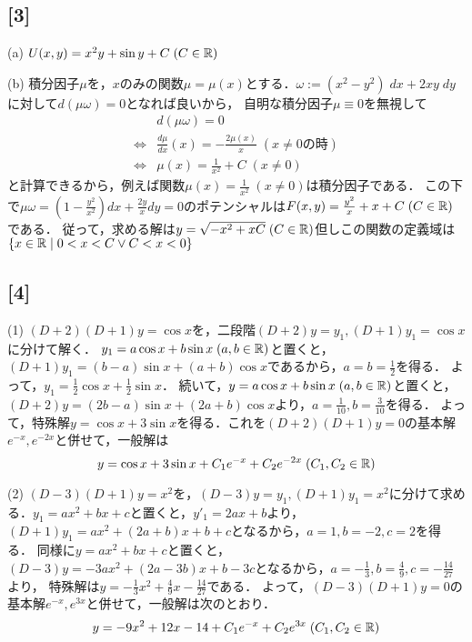 \documentclass[uplatex,dvipdfmx]{jsarticle}
\begin{document}
\subsection*{[3]}
(a) $U(x,y)=x^2y+\sin y+C\;(C\in\mathbb{R})$

(b) 積分因子$\mu$を，$x$のみの関数$\mu=\mu(x)$とする．$\omega:=(x^2-y^2)\;dx+2xy\;dy$に対して$d(\mu\omega)=0$となれば良いから，
自明な積分因子$\mu\equiv 0$を無視して
\begin{align*}
    &d(\mu\omega)=0\\
    \Leftrightarrow& \frac{d\mu}{dx}(x)=-\frac{2\mu(x)}{x}\;(x\ne 0の時)\\
    \Leftrightarrow& \mu(x)=\frac{1}{x^2}+C\;(x\ne 0)
\end{align*}
と計算できるから，例えば関数$\mu(x)=\frac{1}{x^2}\;(x\ne 0)$は積分因子である．
この下で$\mu\omega=\left(1-\frac{y^2}{x^2}\right)dx+\frac{2y}{x}dy=0$のポテンシャルは$F(x,y)=\frac{y^2}{x}+x+C\;(C\in\mathbb{R})$である．
従って，求める解は$y=\sqrt{-x^2+xC}\;(C\in\mathbb{R})$但しこの関数の定義域は$\{x\in\mathbb{R}\mid 0<x<C\lor C<x<0\}$

\subsection*{[4]}
(1) $(D+2)(D+1)y=\cos x$を，二段階$(D+2)y=y_1, (D+1)y_1=\cos x$に分けて解く．
$y_1=a\cos x+b\sin x\;(a,b\in\mathbb{R})$と置くと，$(D+1)y_1=(b-a)\sin x+(a+b)\cos x$であるから，$a=b=\frac{1}{2}$を得る．
よって，$y_1=\frac{1}{2}\cos x+\frac{1}{2}\sin x$．
続いて，$y=a\cos x+b\sin x\;(a,b\in\mathbb{R})$と置くと，$(D+2)y=(2b-a)\sin x+(2a+b)\cos x$より，$a=\frac{1}{10},b=\frac{3}{10}$を得る．
よって，特殊解$y=\cos x+3\sin x$を得る．これを$(D+2)(D+1)y=0$の基本解$e^{-x},e^{-2x}$と併せて，一般解は
\[ y=\cos x+3\sin x + C_1e^{-x}+C_2e^{-2x}\;(C_1,C_2\in\mathbb{R}) \]

(2) $(D-3)(D+1)y=x^2$を，$(D-3)y=y_1,(D+1)y_1=x^2$に分けて求める．$y_1=ax^2+bx+c$と置くと，$y'_1=2ax+b$より，$(D+1)y_1=ax^2+(2a+b)x+b+c$となるから，$a=1,b=-2,c=2$を得る．
同様に$y=ax^2+bx+c$と置くと，$(D-3)y=-3ax^2+(2a-3b)x+b-3c$となるから，$a=-\frac{1}{3},b=\frac{4}{9},c=-\frac{14}{27}$より，
特殊解は$y=-\frac{1}{3}x^2+\frac{4}{9}x-\frac{14}{27}$である．
よって，$(D-3)(D+1)y=0$の基本解$e^{-x},e^{3x}$と併せて，一般解は次のとおり．
\[ y=-9x^2+12x-14+C_1e^{-x}+C_2e^{3x}\;(C_1,C_2\in\mathbb{R}) \]
\end{document}
